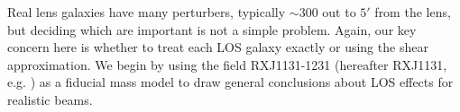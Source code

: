 Real lens galaxies have many perturbers, typically $\sim 300$ out to $5'$ from the lens, but deciding which are important is not a simple problem. Again, our key concern here is whether to treat each LOS galaxy exactly or using the shear approximation. We begin by using the field RXJ1131-1231 (hereafter RXJ1131, e.g. \citealt{Suyu13}) as a fiducial mass model to draw general conclusions about LOS effects for realistic beams. 
  